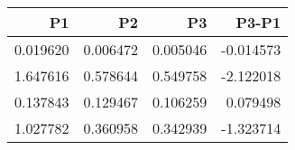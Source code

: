 \begin{tabular}{rrrr}
\toprule
P1 & P2 & P3 & P3-P1 \\
\midrule
0.019620 & 0.006472 & 0.005046 & -0.014573 \\
1.647616 & 0.578644 & 0.549758 & -2.122018 \\
0.137843 & 0.129467 & 0.106259 & 0.079498 \\
1.027782 & 0.360958 & 0.342939 & -1.323714 \\
\bottomrule
\end{tabular}
